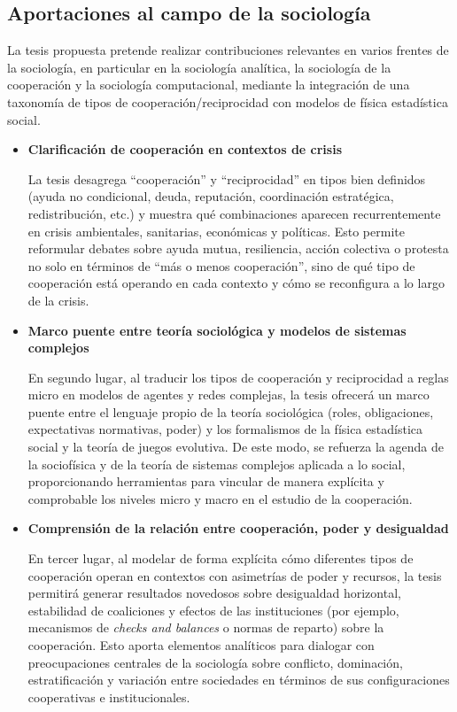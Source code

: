 \documentclass[a4paper,11pt]{article}
\begin{document}
\begin{seccionbox}[azulsuave]{\section*{Aportaciones al campo de la sociología}}
    
La tesis propuesta pretende realizar contribuciones relevantes en varios frentes de la sociología, en particular en la sociología analítica, la sociología de la cooperación y la sociología computacional, mediante la integración de una taxonomía de tipos de cooperación/reciprocidad con modelos de física estadística social.

\begin{itemize}

\item \textbf{Clarificación de cooperación en contextos de crisis}

La tesis desagrega “cooperación” y “reciprocidad” en tipos bien definidos (ayuda no condicional, deuda, reputación, coordinación estratégica, redistribución, etc.) y muestra qué combinaciones aparecen recurrentemente en crisis ambientales, sanitarias, económicas y políticas. Esto permite reformular debates sobre ayuda mutua, resiliencia, acción colectiva o protesta no solo en términos de “más o menos cooperación”, sino de qué tipo de cooperación está operando en cada contexto y cómo se reconfigura a lo largo de la crisis.

\item \textbf{Marco puente entre teoría sociológica y modelos de sistemas complejos}

En segundo lugar, al traducir los tipos de cooperación y reciprocidad a reglas micro en modelos de agentes y redes complejas, la tesis ofrecerá un marco puente entre el lenguaje propio de la teoría sociológica (roles, obligaciones, expectativas normativas, poder) y los formalismos de la física estadística social y la teoría de juegos evolutiva. De este modo, se refuerza la agenda de la sociofísica y de la teoría de sistemas complejos aplicada a lo social, proporcionando herramientas para vincular de manera explícita y comprobable los niveles micro y macro en el estudio de la cooperación.

\item \textbf{Comprensión de la relación entre cooperación, poder y desigualdad}

En tercer lugar, al modelar de forma explícita cómo diferentes tipos de cooperación operan en contextos con asimetrías de poder y recursos, la tesis permitirá generar resultados novedosos sobre desigualdad horizontal, estabilidad de coaliciones y efectos de las instituciones (por ejemplo, mecanismos de \emph{checks and balances} o normas de reparto) sobre la cooperación. Esto aporta elementos analíticos para dialogar con preocupaciones centrales de la sociología sobre conflicto, dominación, estratificación y variación entre sociedades en términos de sus configuraciones cooperativas e institucionales.


\end{itemize}
\end{seccionbox}
\end{document}
